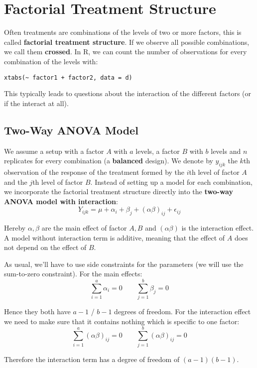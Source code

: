 \section{Factorial Treatment Structure}

Often treatments are combinations of the levels of two or more factors, this is called \textbf{factorial treatment structure}. If we observe all possible combinations, we call them \textbf{crossed}. In R, we can count the number of observations for every combination of the levels with:
\begin{lstlisting}
xtabs(~ factor1 + factor2, data = d)
\end{lstlisting}

This typically leads to questions about the interaction of the different factors (or if the interact at all).


\subsection{Two-Way ANOVA Model}

We assume a setup with a factor $A$ with $a$ levels, a factor $B$ with $b$ levels and $n$ replicates for every combination (a \textbf{balanced} design). We denote by $y_{ijk}$ the $k$th observation of the response of the treatment formed by the $i$th level of factor $A$ and the $j$th level of factor $B$. Instead of setting up a model for each combination, we incorporate the factorial treatment structure directly into the \textbf{two-way ANOVA model with interaction}:
$$Y_{ijk} = \mu + \alpha_i + \beta_j + (\alpha \beta)_{ij} + \epsilon_{ij}$$

Hereby $\alpha, \beta$ are the main effect of factor $A, B$ and $(\alpha \beta)$ is the interaction effect. A model without interaction term is additive, meaning that the effect of $A$ does not depend on the effect of $B$.\medskip

As usual, we'll have to use side constraints for the parameters (we will use the sum-to-zero constraint). For the main effects:
$$\sum_{i=1}^a \alpha_i = 0 \qquad \sum_{j=1}^b \beta_j = 0 $$

Hence they both have $a-1$ / $b-1$ degrees of freedom. For the interaction effect we need to make sure that it contains nothing which is specific to one factor:
$$\sum_{i=1}^a (\alpha \beta)_{ij} = 0 \qquad \sum_{j=1}^b (\alpha \beta)_{ij} = 0$$

Therefore the interaction term has a degree of freedom of $(a-1)(b-1)$.

